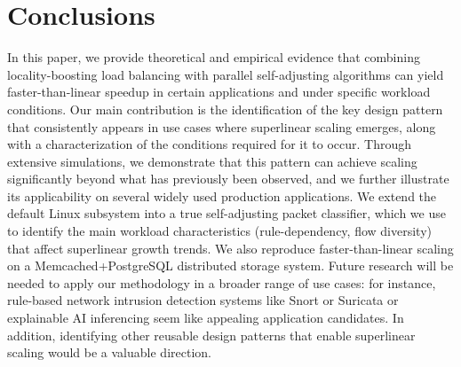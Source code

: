 \section{Conclusions}\label{sec:conclusions}

In this paper, we provide theoretical and empirical evidence that combining locality-boosting load balancing with parallel self-adjusting algorithms can yield faster-than-linear speedup in certain applications and under specific workload conditions. Our main contribution is the identification of the key design pattern that consistently appears in use cases where superlinear scaling emerges, along with a characterization of the conditions required for it to occur. Through extensive simulations, we demonstrate that this pattern can achieve scaling significantly beyond what has previously been observed, and we further illustrate its applicability on several widely used production applications. We extend the default \nftables Linux subsystem into a true self-adjusting packet classifier, which we use to identify the main workload characteristics (rule-dependency, flow diversity) that affect superlinear growth trends.  We also reproduce faster-than-linear scaling on a Memcached+PostgreSQL distributed storage system. Future research will be needed to apply our methodology in a broader range of use cases: for instance, rule-based network intrusion detection systems like Snort or Suricata \cite{10.5555/2537857.2537883} or explainable AI inferencing seem like appealing application candidates. In addition, identifying other reusable design patterns that enable superlinear scaling would be a valuable direction.



